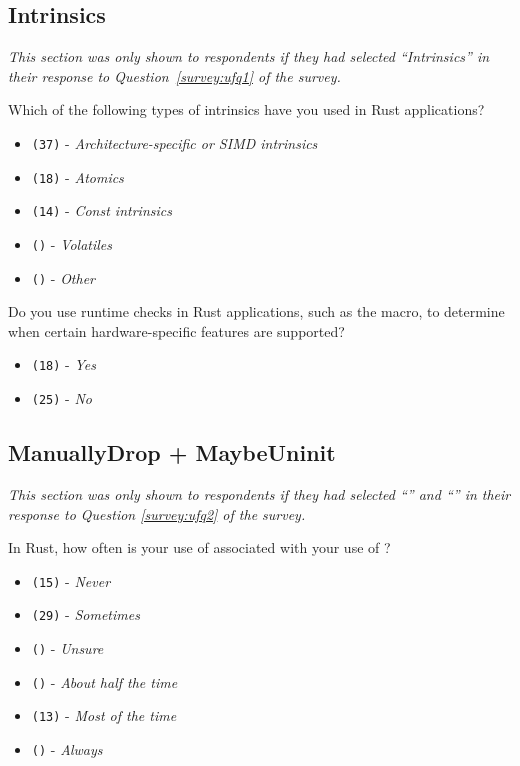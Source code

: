 \subsection{Intrinsics}
\label{survey:sec:itq}
\textit{This section was only shown to respondents if they had selected ``\textit{Intrinsics}'' in their response to Question~\ref{survey:ufq1} of the survey.}
\begin{protocol}
\item \label{survey:itq1}  Which of the following types of intrinsics have you used in Rust applications?
\begin{itemize}
\item \texttt{(37)} - \textit{Architecture-specific or SIMD intrinsics}
\item \texttt{(18)} - \textit{Atomics}
\item \texttt{(14)} - \textit{Const intrinsics}
\item \texttt{()} - \textit{Volatiles}
\item \texttt{()} - \textit{Other}
\end{itemize}
\item \label{survey:itq2}  Do you use runtime checks in Rust applications, such as the  macro, to determine when certain hardware-specific features are supported?
\begin{itemize}
\item \texttt{(18)} - \textit{Yes}
\item \texttt{(25)} - \textit{No}
\end{itemize}
\end{protocol}

\subsection{ManuallyDrop + MaybeUninit}
\label{survey:sec:mdmuq}
\textit{This section was only shown to respondents if they had selected ``'' and ``'' in their response to Question \ref{survey:ufq2} of the survey.}
\begin{protocol}
\item \label{survey:mdmuq1}  In Rust, how often is your use of  associated with your use of ?
\begin{itemize}
\item \texttt{(15)} - \textit{Never}
\item \texttt{(29)} - \textit{Sometimes}
\item \texttt{()} - \textit{Unsure}
\item \texttt{()} - \textit{About half the time}
\item \texttt{(13)} - \textit{Most of the time}
\item \texttt{()} - \textit{Always}
\end{itemize}
\end{protocol}

